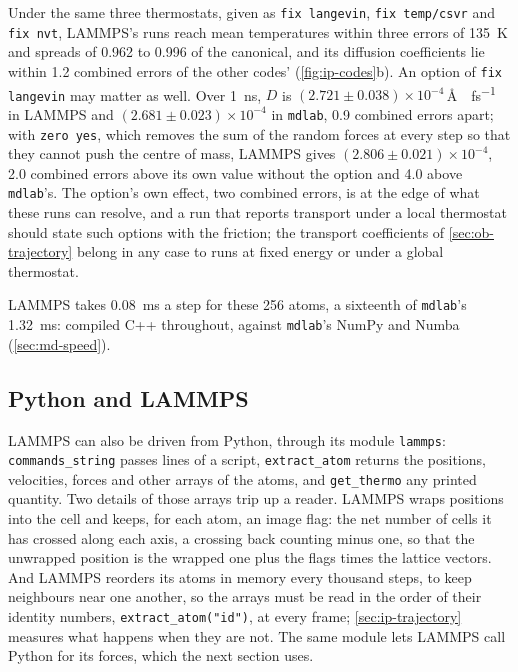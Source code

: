Under the same three thermostats, given as \texttt{fix langevin},
\texttt{fix temp/csvr} and \texttt{fix nvt}, LAMMPS's runs reach mean
temperatures within three errors of \SI{135}{\kelvin} and spreads of
0.962 to 0.996 of the canonical, and its diffusion coefficients lie
within 1.2 combined errors of the other codes' (\cref{fig:ip-codes}b). An
option of \texttt{fix langevin} may matter as well. Over
\SI{1}{\nano\second}, $D$ is $(2.721 \pm 0.038)\times10^{-4}$\,\si{\angstrom
\squared\per\femto\second} in LAMMPS and $(2.681 \pm 0.023)\times10^{-4}$
in \texttt{mdlab}, 0.9 combined errors apart; with \texttt{zero yes},
which removes the sum of the random forces at every step so that they
cannot push the centre of mass, LAMMPS gives $(2.806 \pm
0.021)\times10^{-4}$, 2.0 combined errors above its own value without the
option and 4.0 above \texttt{mdlab}'s. The option's own effect, two
combined errors, is at the edge of what these runs can resolve, and a run that reports transport under a local thermostat should
state such options with the friction; the transport coefficients of
\cref{sec:ob-trajectory} belong in any case to runs at fixed energy or
under a global thermostat.

LAMMPS takes \SI{0.08}{\milli\second} a step for these 256 atoms, a
sixteenth of \texttt{mdlab}'s \SI{1.32}{\milli\second}: compiled C++
throughout, against \texttt{mdlab}'s NumPy and Numba
(\cref{sec:md-speed}).

\subsection*{Python and LAMMPS}

LAMMPS can also be driven from Python, through its module \texttt{lammps}:
\texttt{commands\_\allowbreak string} passes lines of a script,
\texttt{extract\_\allowbreak atom} returns the positions, velocities,
forces and other arrays of the atoms, and \texttt{get\_thermo} any printed
quantity. Two details of those arrays trip up a reader. LAMMPS wraps
positions into the cell and keeps, for each atom, an image flag: the net
number of cells it has crossed along each axis, a crossing back counting
minus one, so that the unwrapped position is the wrapped one plus the
flags times the lattice vectors. And LAMMPS reorders its atoms in memory
every thousand steps, to keep neighbours near one another, so the arrays
must be read in the order of their identity numbers,
\texttt{extract\_\allowbreak atom("id")}, at every frame;
\cref{sec:ip-trajectory} measures what happens when they are not. The same
module lets LAMMPS call Python for its forces, which the next section
uses.

